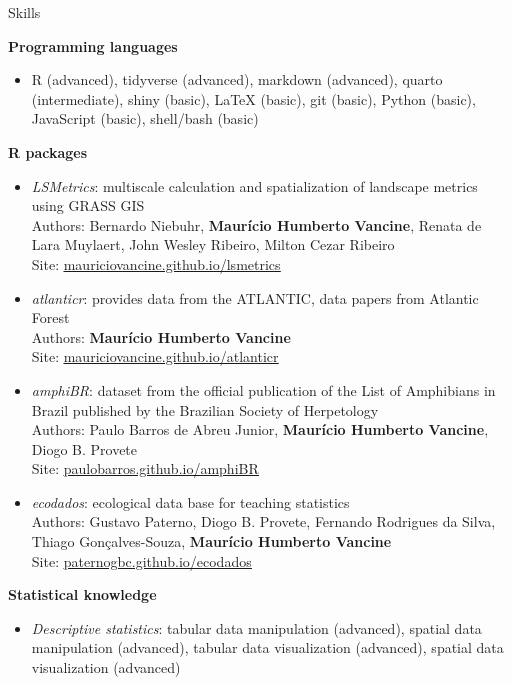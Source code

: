 \documentclass{resume}
\begin{document}
\begin{rSection}{Skills}

{\bf Programming languages}
\begin{itemize}
\item R (advanced), tidyverse (advanced), markdown (advanced), quarto (intermediate), shiny (basic), LaTeX (basic), git (basic), Python (basic), JavaScript (basic), shell/bash (basic)
\end{itemize}

{\bf R packages}
\begin{itemize} 
\item {\it LSMetrics}: multiscale calculation and spatialization of landscape metrics using GRASS GIS
\\ Authors: Bernardo Niebuhr, {\bf Maurício Humberto Vancine}, Renata de Lara Muylaert, John Wesley Ribeiro, Milton Cezar Ribeiro
\\ Site: \href{https://mauriciovancine.github.io/lsmetrics}{\underline{mauriciovancine.github.io/lsmetrics}}

\item {\it atlanticr}: provides data from the ATLANTIC, data papers from Atlantic Forest
\\ Authors: {\bf Maurício Humberto Vancine}
\\ Site: \href{https://mauriciovancine.github.io/atlanticr}{\underline{mauriciovancine.github.io/atlanticr}}

\item {\it amphiBR}: dataset from the official publication of the List of Amphibians in Brazil published by the Brazilian Society of Herpetology
\\ Authors: Paulo Barros de Abreu Junior, {\bf Maurício Humberto Vancine}, Diogo B. Provete
\\ Site: \href{https://paulobarros.github.io/amphiBR}{\underline{paulobarros.github.io/amphiBR}}

\item {\it ecodados}: ecological data base for teaching statistics
\\ Authors: Gustavo Paterno, Diogo B. Provete, Fernando Rodrigues da Silva, Thiago Gonçalves-Souza, {\bf Maurício Humberto Vancine}
\\ Site: \href{https://paternogbc.github.io/ecodados/}{\underline{paternogbc.github.io/ecodados}}
\end{itemize} 

{\bf Statistical knowledge}

\begin{itemize} 
\item {\it Descriptive statistics}: tabular data manipulation (advanced), spatial data manipulation (advanced), tabular data visualization (advanced), spatial data visualization (advanced)


\end{itemize}
\end{rSection}
\end{document}
